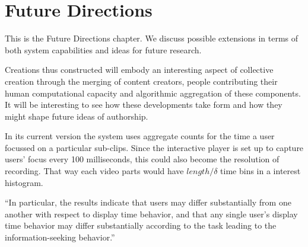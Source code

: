 \chapter{Future Directions}
\label{ch:future}

 

This is the Future Directions chapter. We discuss possible extensions in terms of both system capabilities and ideas for future research.

Creations thus constructed will embody an interesting aspect of collective creation through the merging of content creators, people contributing their human computational capacity and algorithmic aggregation of these components. It will be interesting to see how these developments take form and how they might shape future ideas of authorship.


In its current version the system uses aggregate counts for the time a user focussed on a particular sub-clips. Since the interactive player is set up to capture users' focus every 100 milliseconds, this could also become the resolution of recording. That way each video parts would have $length/\delta$ time bins in a interest histogram.



``In particular, the results indicate that users may differ substantially from one another with respect to display time behavior, and that any single user’s display time behavior may differ substantially according to the task leading to the information-seeking behavior.''\cite{Kelly:2004tq}
